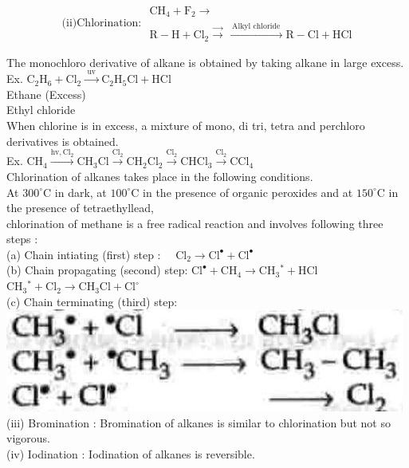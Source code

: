 \documentclass[10pt]{article}
\begin{document}
$$
\text { (ii)Chlorination: } \begin{array}{ll}
\mathrm{CH}_{4}+\mathrm{F}_{2} \longrightarrow \\
\mathrm{R}-\mathrm{H}+\mathrm{Cl}_{2} \xrightarrow{\longrightarrow} \xrightarrow{\text { Alkyl chloride }} \mathrm{R}-\mathrm{Cl}+\mathrm{HCl}
\end{array}
$$

The monochloro derivative of alkane is obtained by taking alkane in large excess.\\
Ex. $\mathrm{C}_{2} \mathrm{H}_{6}+\mathrm{Cl}_{2} \xrightarrow{\text { uv }} \mathrm{C}_{2} \mathrm{H}_{5} \mathrm{Cl}+\mathrm{HCl}$\\
Ethane (Excess)\\
Ethyl chloride\\
When chlorine is in excess, a mixture of mono, di tri, tetra and perchloro derivatives is obtained.\\
Ex. $\mathrm{CH}_{4} \xrightarrow{\mathrm{hv}, \mathrm{Cl}_{2}} \mathrm{CH}_{3} \mathrm{Cl} \xrightarrow{\mathrm{Cl}_{2}} \mathrm{CH}_{2} \mathrm{Cl}_{2} \xrightarrow{\mathrm{Cl}_{2}} \mathrm{CHCl}_{3} \xrightarrow{\mathrm{Cl}_{2}} \mathrm{CCl}_{4}$\\
Chlorination of alkanes takes place in the following conditions.\\
At $300^{\circ} \mathrm{C}$ in dark, at $100^{\circ} \mathrm{C}$ in the presence of organic peroxides and at $150^{\circ} \mathrm{C}$ in the presence of tetraethyllead,\\
chlorination of methane is a free radical reaction and involves following three steps :\\
(a) Chain intiating (first) step : $\quad \mathrm{Cl}_{2} \longrightarrow \mathrm{Cl}^{\bullet}+\mathrm{Cl}^{\bullet}$\\
(b) Chain propagating (second) step: $\mathrm{Cl}^{\bullet}+\mathrm{CH}_{4} \longrightarrow \mathrm{CH}_{3}{ }^{*}+\mathrm{HCl}$\\
$\mathrm{CH}_{3}{ }^{*}+\mathrm{Cl}_{2} \longrightarrow \mathrm{CH}_{3} \mathrm{Cl}+\mathrm{Cl}^{\circ}$\\
(c) Chain terminating (third) step:\\
\includegraphics[max width=\textwidth, center]{2025_01_28_8470952b98110cec3aabg-173}\\
(iii) Bromination : Bromination of alkanes is similar to chlorination but not so vigorous.\\
(iv) Iodination : Iodination of alkanes is reversible.
\end{document}
